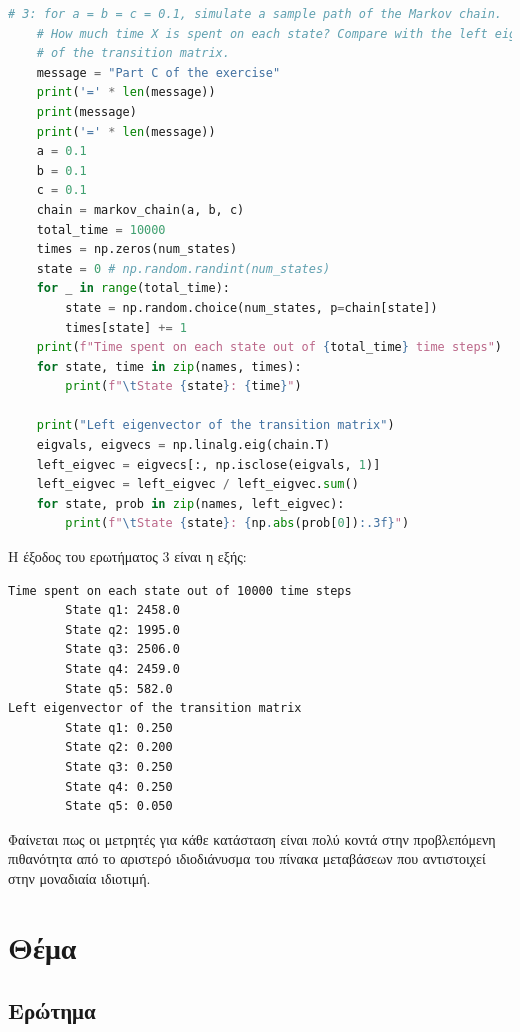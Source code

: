 \documentclass{article}
\begin{document}
\begin{lstlisting}[language=Python]
    # 3: for a = b = c = 0.1, simulate a sample path of the Markov chain.
    # How much time X is spent on each state? Compare with the left eigenvector
    # of the transition matrix.
    message = "Part C of the exercise"
    print('=' * len(message))
    print(message)
    print('=' * len(message))
    a = 0.1
    b = 0.1
    c = 0.1
    chain = markov_chain(a, b, c)
    total_time = 10000
    times = np.zeros(num_states)
    state = 0 # np.random.randint(num_states)
    for _ in range(total_time):
        state = np.random.choice(num_states, p=chain[state])
        times[state] += 1
    print(f"Time spent on each state out of {total_time} time steps")
    for state, time in zip(names, times):
        print(f"\tState {state}: {time}")

    print("Left eigenvector of the transition matrix")
    eigvals, eigvecs = np.linalg.eig(chain.T)
    left_eigvec = eigvecs[:, np.isclose(eigvals, 1)]
    left_eigvec = left_eigvec / left_eigvec.sum()
    for state, prob in zip(names, left_eigvec):
        print(f"\tState {state}: {np.abs(prob[0]):.3f}")
\end{lstlisting}

Η έξοδος του ερωτήματος 3 είναι η εξής:

\begin{verbatim}
Time spent on each state out of 10000 time steps
        State q1: 2458.0
        State q2: 1995.0
        State q3: 2506.0
        State q4: 2459.0
        State q5: 582.0
Left eigenvector of the transition matrix
        State q1: 0.250
        State q2: 0.200
        State q3: 0.250
        State q4: 0.250
        State q5: 0.050
\end{verbatim}

Φαίνεται πως οι μετρητές για κάθε κατάσταση είναι πολύ κοντά στην προβλεπόμενη
πιθανότητα από το αριστερό ιδιοδιάνυσμα του πίνακα μεταβάσεων που αντιστοιχεί
στην μοναδιαία ιδιοτιμή.

\clearpage
\section{Θέμα}

\subsection{Ερώτημα}
\end{document}
